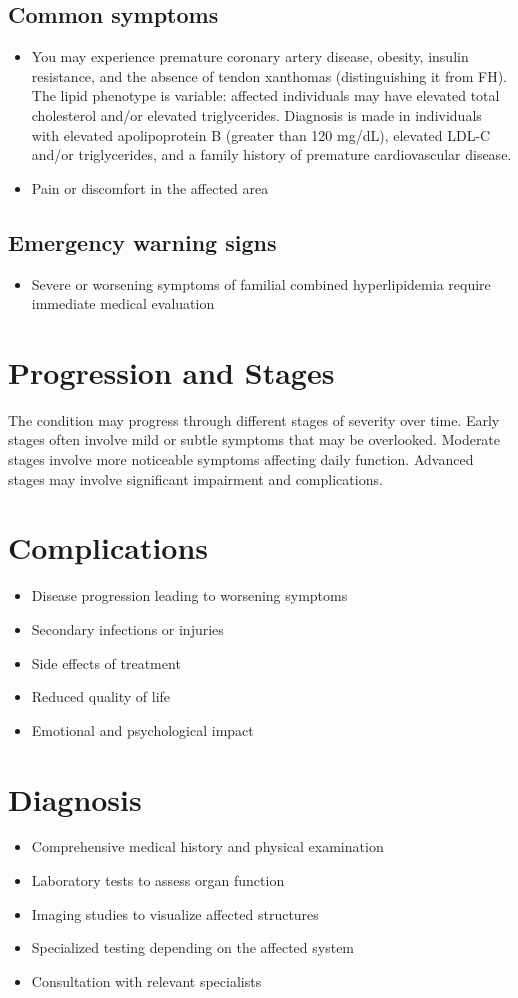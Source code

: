 \subsection{Common symptoms}
\begin{itemize}[noitemsep]
  \item You may experience premature coronary artery disease, obesity, insulin resistance, and the absence of tendon xanthomas (distinguishing it from FH). The lipid phenotype is variable: affected individuals may have elevated total cholesterol and/or elevated triglycerides. Diagnosis is made in individuals with elevated apolipoprotein B (greater than 120 mg/dL), elevated LDL-C and/or triglycerides, and a family history of premature cardiovascular disease.
  \item Pain or discomfort in the affected area
  \end{itemize}
\subsection{Emergency warning signs}
\begin{itemize}[noitemsep]
  \item Severe or worsening symptoms of familial combined hyperlipidemia require immediate medical evaluation
\end{itemize}
\section{Progression and Stages}
The condition may progress through different stages of severity over time. Early stages often involve mild or subtle symptoms that may be overlooked. Moderate stages involve more noticeable symptoms affecting daily function. Advanced stages may involve significant impairment and complications.
\section{Complications}
\begin{itemize}[noitemsep]
  \item Disease progression leading to worsening symptoms
  \item Secondary infections or injuries
  \item Side effects of treatment
  \item Reduced quality of life
  \item Emotional and psychological impact
\end{itemize}
\section{Diagnosis}
\begin{itemize}[noitemsep]
  \item Comprehensive medical history and physical examination
  \item Laboratory tests to assess organ function
  \item Imaging studies to visualize affected structures
  \item Specialized testing depending on the affected system
  \item Consultation with relevant specialists
\end{itemize}
